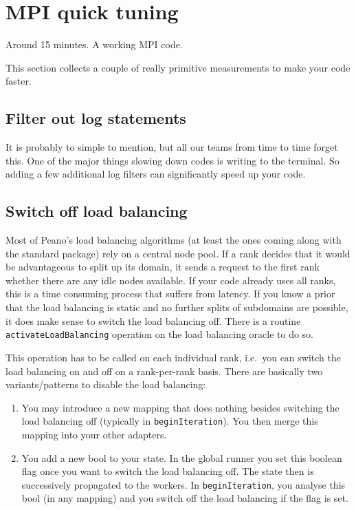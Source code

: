 \section{MPI quick tuning}


\chapterDescription
  {
    Around 15 minutes.
  }
  {
    A working MPI code.
  }


This section collects a couple of really primitive measurements to make your
code faster.

\subsection{Filter out log statements}

It is probably to simple to mention, but all our teams from time to time forget
this. 
One of the major things slowing down codes is writing to the terminal. 
So adding a few additional log filters can significantly speed up your code.



\subsection{Switch off load balancing}

Most of Peano's load balancing algorithms (at least the ones coming along with
the standard package) rely on a central node pool.
If a rank decides that it would be advantageous to split up its domain, it sends
a request to the first rank whether there are any idle nodes available.
If your code already uses all ranks, this is a time consuming process that
suffers from latency.
If you know a prior that the load balancing is static and no further splits of
subdomains are possible, it does make sense to switch the load balancing off.
There is a routine \texttt{activateLoadBalancing} operation on the load
balancing oracle to do so.

This operation has to be called on each individual rank, i.e.~you can switch 
the load balancing on and off on a rank-per-rank basis. There are basically two
variants/patterns to disable the load balancing:
\begin{enumerate}
  \item You may introduce a new mapping that does nothing besides switching the
  load balancing off (typically in \texttt{beginIteration}). You then merge this
  mapping into your other adapters.
  \item You add a new bool to your state. In the global runner you set this
  boolean flag once you want to switch the load balancing off. The state then is
  successively propagated to the workers. In \texttt{beginIteration}, you
  analyse this bool (in any mapping) and you switch off the load balancing if
  the flag is set.
\end{enumerate}

